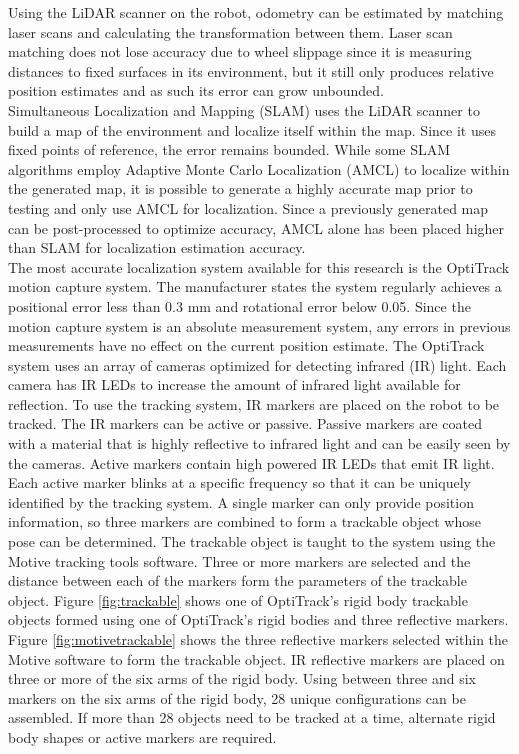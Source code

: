 Using the LiDAR scanner on the robot, odometry can be estimated by matching laser scans and calculating the transformation between them. Laser scan matching does not lose accuracy due to wheel slippage since it is measuring distances to fixed surfaces in its environment, but it still only produces relative position estimates and as such its error can grow unbounded.\\

Simultaneous Localization and Mapping (SLAM) uses the LiDAR scanner to build a map of the environment and localize itself within the map. Since it uses fixed points of reference, the error remains bounded. While some SLAM algorithms employ Adaptive Monte Carlo Localization (AMCL) to localize within the generated map, it is possible to generate a highly accurate map prior to testing and only use AMCL for localization. Since a previously generated map can be post-processed to optimize accuracy, AMCL alone has been placed higher than SLAM for localization estimation accuracy.\\

The most accurate localization system available for this research is the OptiTrack motion capture system. The manufacturer states the system regularly achieves a positional error less than 0.3 mm and rotational error below 0.05\degree. Since the motion capture system is an absolute measurement system, any errors in previous measurements have no effect on the current position estimate. The OptiTrack system uses an array of cameras optimized for detecting infrared (IR) light. Each camera has IR LEDs to increase the amount of infrared light available for reflection. To use the tracking system, IR markers are placed on the robot to be tracked. The IR markers can be active or passive. Passive markers are coated with a material that is highly reflective to infrared light and can be easily seen by the cameras. Active markers contain high powered IR LEDs that emit IR light. Each active marker blinks at a specific frequency so that it can be uniquely identified by the tracking system. A single marker can only provide position information, so three markers are combined to form a trackable object whose pose can be determined. The trackable object is taught to the system using the Motive tracking tools software. Three or more markers are selected and the distance between each of the markers form the parameters of the trackable object. Figure \ref{fig:trackable} shows one of OptiTrack's rigid body trackable objects formed using one of OptiTrack's rigid bodies and three reflective markers. Figure \ref{fig:motivetrackable} shows the three reflective markers selected within the Motive software to form the trackable object. IR reflective markers are placed on three or more of the six arms of the rigid body. Using between three and six markers on the six arms of the rigid body, 28 unique configurations can be assembled. If more than 28 objects need to be tracked at a time, alternate rigid body shapes or active markers are required.\\


